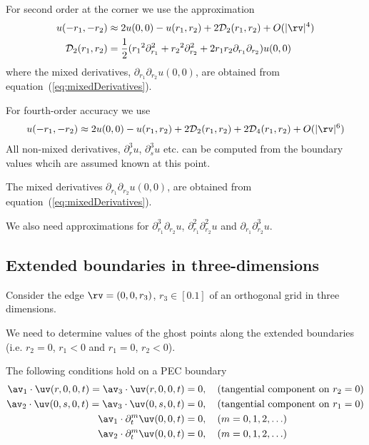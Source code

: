 \documentclass[10pt]{article}
\newcommand{\Ds}{{\mathcal D}}%
\newcommand{\ra}{{r_1}}%
\newcommand{\rb}{{r_2}}%
\newcommand{\rc}{{r_3}}%
\newcommand{\tc}{{t}}%
\begin{document}
For second order at the corner we use the approximation
\begin{align}
   u(-\ra,-\rb) &\approx 2 u(0,0) - u(\ra,\rb) + 2\Ds_2(\ra,\rb) + \truncb \\
\Ds_2(\ra,\rb) &= {1\over2}( \ra^2\partial_\ra^2+\rb^2\partial_\rb^2+ 2\ra\rb\partial_\ra\partial_\rb )u(0,0)
\end{align}
where the mixed derivatives, $\partial_\ra\partial_\rb u(0,0) $,
are obtained from equation~(\ref{eq:mixedDerivatives}). 


For fourth-order accuracy we use
\begin{align}
   u(-\ra,-\rb) &\approx 2 u(0,0) - u(\ra,\rb) + 2\Ds_2(\ra,\rb) + 2\Ds_4(\ra,\rb) + \trunc \\
\end{align}
All non-mixed derivatives, $\partial_r^3 u$, $\partial_s^3 u$ etc. can be computed from the boundary
values whcih are assumed known at this point.

The mixed derivatives $\partial_\ra\partial_\rb u(0,0) $,
are obtained from equation~(\ref{eq:mixedDerivatives}). 

We also need approximations for $\partial_\ra^3\partial_\rb u$,
 $\partial_\ra^2\partial_\rb^2 u$ and $\partial_\ra\partial_\rb^3 u$.



\clearpage
\subsection{Extended boundaries in three-dimensions}

Consider the edge $\rv=(0,0,\rc)$, $\rc\in[0.1]$ of an orthogonal grid in three dimensions. 

We need to determine values of the ghost points along the 
extended boundaries (i.e. $\rb=0$, $\ra<0$ and $\ra=0$, $\rb<0$).


The following conditions hold on a PEC boundary
\begin{align*}
  \av_1\cdot\uv(r,0,0,\tc)=\av_3\cdot\uv(r,0,0,\tc) &= 0,  \quad\mbox{(tangential component on $\rb=0$)}\\
  \av_2\cdot\uv(0,s,0,\tc)=\av_3\cdot\uv(0,s,0,\tc) &= 0,  \quad\mbox{(tangential component on $\ra=0$)}\\
  \av_1\cdot\partial_t^m\uv(0,0,t) &= 0, \quad\mbox{($m=0,1,2,\ldots$)} \\
  \av_2\cdot\partial_t^m\uv(0,0,t) &= 0, \quad\mbox{($m=0,1,2,\ldots$)} 
\end{align*}
\end{document}
